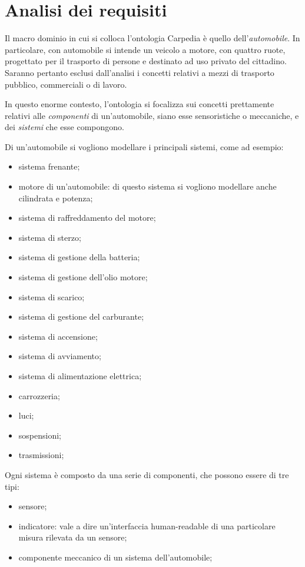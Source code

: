 \chapter{Analisi dei requisiti}
Il macro dominio in cui si colloca l'ontologia Carpedia è quello dell'\textit{automobile}. In particolare, con automobile si intende un veicolo a motore, con quattro ruote,
progettato per il trasporto di persone e destinato ad uso privato del cittadino.
Saranno pertanto esclusi dall'analisi i concetti relativi a mezzi di trasporto pubblico, commerciali o di lavoro.

In questo enorme contesto, l'ontologia si focalizza sui concetti prettamente relativi alle \textit{componenti} di un'automobile, siano esse sensoristiche o meccaniche, e dei \textit{sistemi} che
esse compongono.

Di un'automobile si vogliono modellare i principali sistemi, come ad esempio:

\begin{itemize}
    \item sistema frenante;
    \item motore di un'automobile: di questo sistema si vogliono modellare anche cilindrata e potenza;
    \item sistema di raffreddamento del motore;
    \item sistema di sterzo;
    \item sistema di gestione della batteria;
    \item sistema di gestione dell'olio motore;
    \item sistema di scarico;
    \item sistema di gestione del carburante;
    \item sistema di accensione;
    \item sistema di avviamento;
    \item sistema di alimentazione elettrica;
    \item carrozzeria;
    \item luci;
    \item sospensioni;
    \item trasmissioni;
\end{itemize}

Ogni sistema è composto da una serie di componenti, che possono essere di tre tipi:
\begin{itemize}
    \item sensore;
    \item indicatore: vale a dire un'interfaccia human-readable di una particolare misura rilevata da un sensore;
    \item componente meccanico di un sistema dell'automobile;
\end{itemize}

